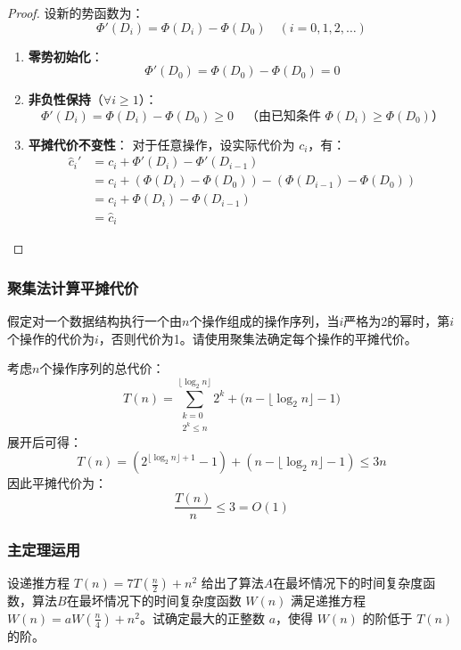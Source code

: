 \documentclass[./../main.tex]{subfiles} %
\begin{document}
\begin{proof}
设新的势函数为：
$$
\Phi'(D_i) = \Phi(D_i) - \Phi(D_0) \quad (i = 0,1,2,\ldots)
$$

\begin{enumerate}
\item \textbf{零势初始化}：
$$
\Phi'(D_0) = \Phi(D_0) - \Phi(D_0) = 0
$$

\item \textbf{非负性保持}（$\forall i \geq 1$）：
$$
\Phi'(D_i) = \Phi(D_i) - \Phi(D_0) \geq 0 \quad \text{（由已知条件 $\Phi(D_i) \geq \Phi(D_0)$）}
$$

\item \textbf{平摊代价不变性}：
对于任意操作，设实际代价为 $c_i$，有：
$$
\begin{aligned}
\hat{c}_i' &= c_i + \Phi'(D_i) - \Phi'(D_{i-1}) \\
&= c_i + (\Phi(D_i) - \Phi(D_0)) - (\Phi(D_{i-1}) - \Phi(D_0)) \\
&= c_i + \Phi(D_i) - \Phi(D_{i-1}) \\
&= \hat{c}_i
\end{aligned}
$$
\end{enumerate}
\end{proof}

\subsubsection{聚集法计算平摊代价}
假定对一个数据结构执行一个由$n$个操作组成的操作序列，当$i$严格为2的幂时，第$i$个操作的代价为$i$，否则代价为1。请使用聚集法确定每个操作的平摊代价。

考虑$n$个操作序列的总代价：
$$
T(n) = \sum_{\substack{k=0 \\ 2^k \leq n}}^{\lfloor \log_2 n \rfloor} 2^k + \Big(n - \lfloor \log_2 n \rfloor -1\Big)
$$
展开后可得：
$$
T(n) = (2^{\lfloor \log_2 n \rfloor +1} -1) + (n - \lfloor \log_2 n \rfloor -1) \leq 3n
$$
因此平摊代价为：
$$
\frac{T(n)}{n} \leq 3 = O(1)
$$

\subsubsection{主定理运用}
设递推方程 $T(n)=7T(\frac{n}{2})+n^{2}$ 给出了算法$A$在最坏情况下的时间复杂度函数，算法$B$在最坏情况下的时间复杂度函数 $W(n)$ 满足递推方程 $W(n)=aW(\frac{n}{4})+n^{2}$。试确定最大的正整数 $a$，使得 $W(n)$ 的阶低于 $T(n)$ 的阶。
\end{document}
